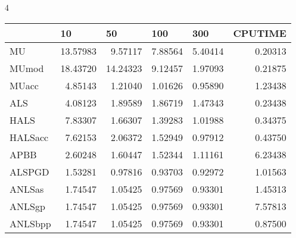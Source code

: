 \documentclass{article}
\begin{document}
4
\begin{table}[H]
	\centering
	\begin{tabular}{|l|r|r|r|r|r|}
		\hline
		& \multicolumn{1}{l|}{10}      & \multicolumn{1}{l|}{50}      & \multicolumn{1}{l|}{100}     & \multicolumn{1}{l|}{300}     & \multicolumn{1}{l|}{CPUTIME} \\ \hline
		MU       & 13.57983                     & 9.57117                      & 7.88564                      & 5.40414                      & 0.20313                      \\ \hline
		MUmod    & 18.43720                     & 14.24323                     & 9.12457                      & 1.97093                      & 0.21875                      \\ \hline
		MUacc    & 4.85143                      & 1.21040                      & 1.01626                      & 0.95890                      & 1.23438                      \\ \hline
		ALS      & \multicolumn{1}{r|}{4.08123} & \multicolumn{1}{r|}{1.89589} & \multicolumn{1}{r|}{1.86719} & \multicolumn{1}{r|}{1.47343} & \multicolumn{1}{r|}{0.23438} \\ \hline
		HALS     & 7.83307                      & 1.66307                      & 1.39283                      & 1.01988                      & 0.34375                      \\ \hline
		HALSacc  & 7.62153                      & 2.06372                      & 1.52949                      & 0.97912                      & 0.43750                      \\ \hline
		APBB     & 2.60248                      & 1.60447                      & 1.52344                      & 1.11161                      & 6.23438                      \\ \hline
		ALSPGD   & 1.53281                      & 0.97816                      & 0.93703                      & 0.92972                      & 1.01563                      \\ \hline
		ANLSas   & 1.74547                      & 1.05425                      & 0.97569                      & 0.93301                      & 1.45313                      \\ \hline
		ANLSgp   & 1.74547                      & 1.05425                      & 0.97569                      & 0.93301                      & 7.57813                      \\ \hline
		ANLSbpp  & 1.74547                      & 1.05425                      & 0.97569                      & 0.93301                      & 0.87500                      \\ \hline

\end{tabular}
\end{table}
\end{document}
